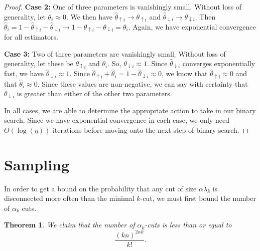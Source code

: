 \documentclass{acm_proc_article-sp}
\newtheorem{theorem}{Theorem}
\begin{document}
\begin{proof}
\textbf{Case 2:} One of three parameters is vanishingly small. Without loss of generality, let $\theta_i \approx 0$. We then have $\hat{\theta}_{\uparrow i} \to \theta_{\uparrow i}$ and $\hat{\theta}_{\downarrow i} \to \theta_{\downarrow i}$. Then $\hat{\theta}_i = 1 - \hat{\theta}_{\uparrow i} - \hat{\theta}_{\downarrow i} \to 1 - \theta_{\uparrow i} - \theta_{\downarrow i} = \theta_i$. Again, we have exponential convergence for all estimators.

\textbf{Case 3:} Two of three parameters are vanishingly small. Without loss of generality, let these be $\theta_{\uparrow i}$ and $\theta_{i}$. So, $\theta_{\downarrow i} \approx 1$. Since $\hat{\theta}_{\downarrow i}$ converges exponentially fast, we have $\hat{\theta}_{\downarrow i} \approx 1$. Since $\hat{\theta}_{\uparrow i} + \hat{\theta}_i = 1 - \hat{\theta}_{\downarrow i} \approx 0$, we know that $\hat{\theta}_{\uparrow i} \approx 0$ and that $\hat{\theta}_{i} \approx 0$. Since these values are non-negative, we can say with certainty that $\theta_{\downarrow i}$ is greater than either of the other two parameters.

In all cases, we are able to determine the appropriate action to take in our binary search. Since we have exponential convergence in each case, we only need $O(\log(\eta))$ iterations before moving onto the next step of binary search.
\end{proof}



\section{Sampling} In order to get a bound on the probability that any cut of size $\alpha \lambda_k$ is disconnected more often than the minimal $k$-cut, we must first bound the number of $\alpha_k$ cuts.

\begin{theorem}
We claim that the number of $\alpha_k$-cuts is less than or equal to
\[
\frac{(kn)^{2 \alpha k}}{k!}.
\]
\end{theorem}
\end{document}
